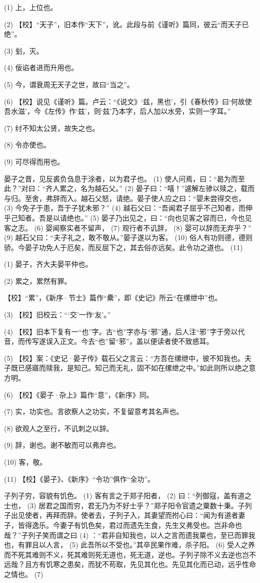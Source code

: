 \documentclass[12pt,UTF8]{ctexbook}
\begin{document}
(1) 上，上位也。

(2) 【校】“天子”，旧本作“天下”，讹。此段与前《谨听》篇同，彼云“而天子已绝”。

(3) 刬，灭。

(4) 佞谄者进而升用也。

(5) 今，谓衰周无天子之世，故曰“当之”。

(6) 【校】说见《谨听》篇。卢云：“《说文》‘兹，黑也’，引《春秋传》曰‘何故使吾水滋’，今《左传》作‘兹’，则‘兹’乃本字，后人加以水旁，实则一字耳。”

(7) 纣不知太公贤，故失之也。

(8) 令亦使也。

(9) 可尽得而用也。

晏子之晋，见反裘负刍息于涂者，以为君子也。 (1) 使人问焉，曰：“曷为而至此？”对曰：“齐人累之，名为越石父。” (2) 晏子曰：“嘻！”遽解左骖以赎之，载而与归。至舍，弗辞而入。越石父怒，请绝。晏子使人应之曰：“婴未尝得交也， (3) 今免子于患，吾于子犹未邪？” (4) 越石父曰：“吾闻君子屈乎不己知者，而伸乎己知者。吾是以请绝也。” (5) 晏子乃出见之，曰：“向也见客之容而已，今也见客之志。 (6) 婴闻察实者不留声， (7) 观行者不讥辞， (8) 婴可以辞而无弃乎？” (9) 越石父曰：“夫子礼之，敢不敬从。”晏子遂以为客。 (10) 俗人有功则德，德则骄。今晏子功免人于厄矣，而反屈下之，其去俗亦远矣。此令功之道也。 (11)

(1) 晏子，齐大夫晏平仲也。

(2) 累之，累然有罪。

【校】“累”，《新序·节士》篇作“纍”，即《史记》所云“在缧绁中”也。

(3) 【校】旧校云：“‘交’一作‘友’。”

(4) 【校】旧本下复有一“也”字。古“也”字亦与“邪”通，后人注“邪”字于旁以代音，而传写遂误入正文。今去“也”留“邪”，盖以便读者使不致惑耳。

(5) 【校】案：《史记·晏子传》载石父之言云：“方吾在缧绁中，彼不知我也。夫子既已感寤而赎我，是知己。知己而无礼，固不如在缧绁之中。”如此则所以绝之意方明。

(6) 【校】《晏子·杂上》篇作“意”，《新序》同。

(7) 实，功实也。言欲察人之功实，不复留意考其名声也。

(8) 欲观人之至行，不讥刺之以辞。

(9) 辞，谢也。谢不敏而可以弗弃也。

(10) 客，敬。

(11) 【校】《晏子》、《新序》“令功”俱作“全功”。

子列子穷，容貌有饥色。 (1) 客有言之于郑子阳者， (2) 曰：“列御寇，盖有道之士也， (3) 居君之国而穷，君无乃为不好士乎？”郑子阳令官遗之粟数十秉。子列子出见使者，再拜而辞。使者去，子列子入，其妻望而拊心曰：“闻为有道者妻子，皆得逸乐。今妻子有饥色矣，君过而遗先生食，先生又弗受也。岂非命也哉？”子列子笑而谓之曰 (4) ：“君非自知我也，以人之言而遗我粟也，至已而罪我也，有罪且以人言， (5) 此吾所以不受也。”其卒民果作难，杀子阳。 (6) 受人之养而不死其难则不义，死其难则死无道也，死无道，逆也。子列子除不义去逆也岂不远哉？且方有饥寒之患矣，而犹不苟取，先见其化也。先见其化而已动，远乎性命之情也。 (7)
\end{document}
